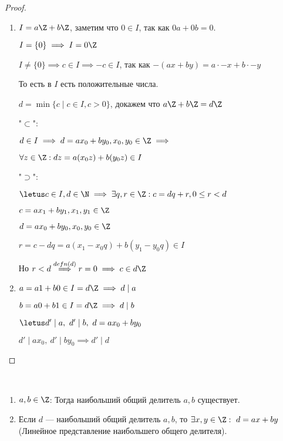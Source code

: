 \begin{proof}~
    \begin{enumerate}
        \item $I = a\Z + b\Z$, заметим что $0 \in I$, так как $0a + 0b = 0$.
        
        $I = \{0\} \implies I = 0\Z$
        
        $I \neq \{0\} \implies c \in I \implies -c \in I$, так как $-(ax + by) = a \cdot -x + b \cdot -y$
        
        То есть в $I$ есть положительные числа.
        
        $d = \min\{ c \mid c \in I, c > 0 \}$, докажем что $a\Z + b\Z = d\Z$
        
        "$\subset$":
        
        $d \in I \implies d = ax_0 + by_0, x_0, y_0 \in \Z \implies$
        
        $\forall z \in \Z: dz = a(x_0z) + b(y_0z) \in I$
        
        "$\supset$":
        
        $\letus c \in I, d \in \N \implies \exists q, r \in \Z: c = dq + r, 0 \leq r < d$
        
        $c = ax_1 + by_1, x_1, y_1 \in \Z$
        
        $d = ax_0 + by_0, x_0, y_0 \in \Z$
        
        $r = c - dq = a(x_1 -x_0q) + b(y_1 - y_0q) \in I$
        
        Но $r < d \overset{defn(d)}{\implies} r = 0 \implies c \in d\Z$
        
        \item $a = a1 + b0 \in I = d\Z \implies d \mid a$
        
        $b = a0 + b1 \in I = d\Z \implies d \mid b$
        
        $\letus d' \mid a,~d' \mid b,~d=ax_0 + by_0$
        
        $d' \mid ax_0,~d' \mid by_0 \implies d' \mid d$
    \end{enumerate}
\end{proof}

\begin{follow}~
    \begin{enumerate}
        \item $a, b \in \Z$: Тогда наибольший общий делитель $a, b$ существует.
        
        \item Если $d$ --- наибольший общий делитель $a, b$, то $\exists x, y \in \Z:~d = ax + by$(Линейное представление наибольшего общего делителя).
    \end{enumerate}
\end{follow}

